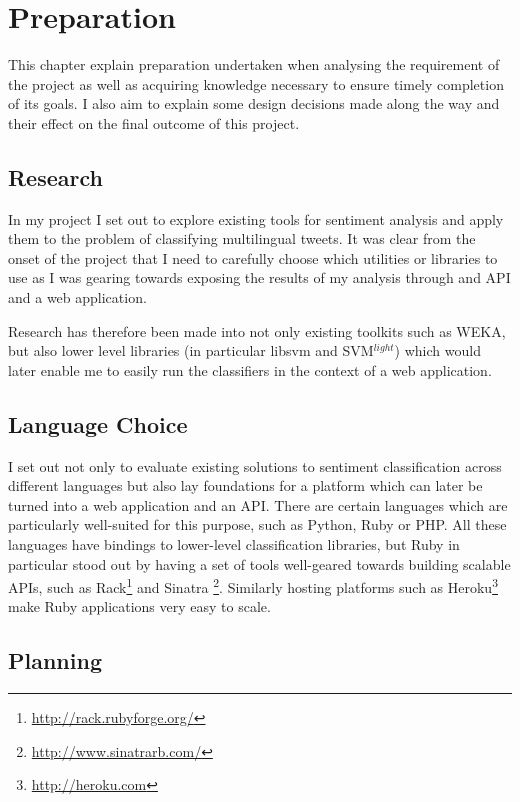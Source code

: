\chapter{Preparation}

This chapter explain preparation undertaken when analysing the requirement of the project as well as acquiring knowledge necessary to ensure timely completion of its goals. I also aim to explain some design decisions made along the way and their effect on the final outcome of this project.

\section{Research}

In my project I set out to explore existing tools for sentiment analysis and apply them to the problem of classifying multilingual tweets. It was clear from the onset of the project that I need to carefully choose which utilities or libraries to use as I was gearing towards exposing the results of my analysis through and API and a web application.

Research has therefore been made into not only existing toolkits such as WEKA, but also lower level libraries (in particular libsvm and SVM$^{light}$) which would later enable me to easily run the classifiers in the context of a web application.

\section{Language Choice}

I set out not only to evaluate existing solutions to sentiment classification across different languages but also lay foundations for a platform which can later be turned into a web application and an API. There are certain languages which are particularly well-suited for this purpose, such as  Python, Ruby or PHP. All these languages have bindings to lower-level classification libraries, but Ruby in particular stood out by having a set of tools well-geared towards building scalable APIs, such as Rack\footnote{\url{http://rack.rubyforge.org/}} and Sinatra \footnote{\url{http://www.sinatrarb.com/}}. Similarly hosting platforms such as Heroku\footnote{\url{http://heroku.com}} make Ruby applications very easy to scale.

\section{Planning}

